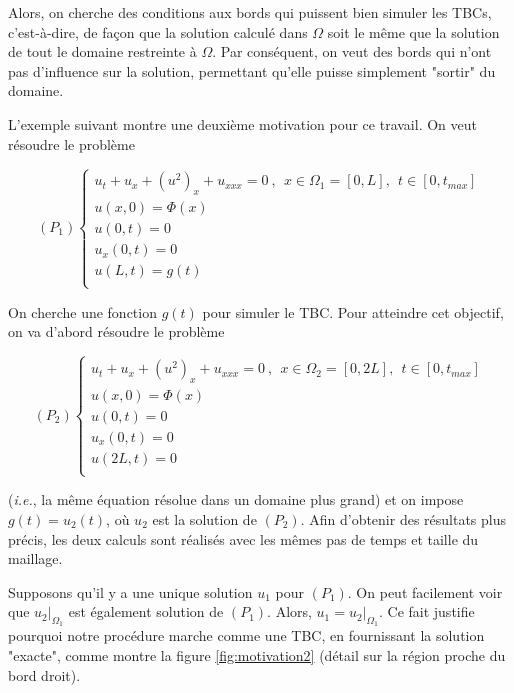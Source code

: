 \indent Alors, on cherche des conditions aux bords qui puissent bien simuler les TBCs, c'est-à-dire, de façon que la solution calculé dans $\Omega$ soit le même que la solution de tout le domaine restreinte à $\Omega$. Par conséquent, on veut des bords qui n'ont pas d'influence sur la solution, permettant qu'elle puisse simplement "sortir" du domaine.

\indent L'exemple suivant montre une deuxième motivation pour ce travail. On veut résoudre le problème 

\begin{equation*}
    (P_1) \begin{cases}
    u_t + u_x + (u^2)_x + u_{xxx} = 0 \ , \ \ x \in \Omega_1 = [0,L], \ \ t \in [0, t_{max}] \\
    u(x,0) = \Phi(x) \\
    u(0,t) = 0 \\
    u_x(0,t) = 0 \\
    u(L,t) = g(t)  \\ 
    \end{cases}
\end{equation*}

\indent On cherche une fonction  $g(t)$ pour simuler le TBC. Pour atteindre cet objectif, on va d'abord résoudre le problème

\begin{equation*}
    (P_2) \begin{cases}
    u_t + u_x + (u^2)_x + u_{xxx} = 0 \ , \ \ x \in \Omega_2 = [0,2L], \ \ t \in [0, t_{max}] \\
    u(x,0) = \Phi(x) \\
    u(0,t) = 0 \\
    u_x(0,t) = 0 \\
    u(2L,t) = 0  \\ 
    \end{cases}
\end{equation*}

\noindent (\emph{i.e.}, la même équation résolue dans un domaine plus grand) et on impose $g(t) = u_2(t)$, où $u_2$ est la solution de $(P_2)$. Afin d'obtenir des résultats plus précis, les deux calculs sont réalisés avec les mêmes pas de temps et taille du maillage.

\indent Supposons qu'il y a une unique solution $u_1$ pour $(P_1)$. On peut facilement voir que $u_2|_{\Omega_1}$ est également solution de $(P_1)$. Alors, $u_1 = u_2|_{\Omega_1}$. Ce fait justifie pourquoi notre procédure marche comme une TBC, en fournissant la solution "exacte", comme montre la figure \ref{fig:motivation2}  (détail sur la région proche du bord droit).

